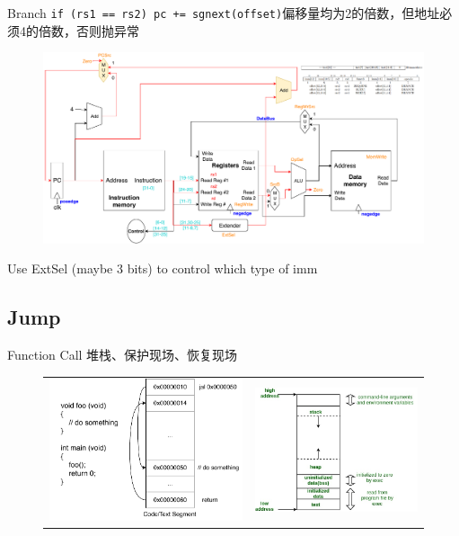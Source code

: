 \documentclass{myslide}
\begin{document}
\begin{frame}[fragile]{Branch}
\fontsm \verb'if (rs1 == rs2) pc += sgnext(offset)'偏移量均为2的倍数，但地址必须4的倍数，否则抛异常
\begin{figure}
\centering
\includegraphics[width=\linewidth]{fig/Lecture2/Datapath-branch.pdf}
\end{figure}
Use ExtSel (maybe 3 bits) to control which type of imm
\end{frame}

\subsection{Jump}
\begin{frame}
\subsectionpage
\end{frame}

\begin{frame}{Function Call}
堆栈、保护现场、恢复现场
\begin{figure}
\centering
\begin{tabular}{cc}
\includegraphics[width=0.5\linewidth]{fig/Lecture2/Abstraction-Function_Call.pdf}&
\includegraphics[width=0.5\linewidth]{fig/Lecture2/memoryLayoutC.jpg}
\end{tabular}
\end{figure}
\end{frame}
\end{document}

